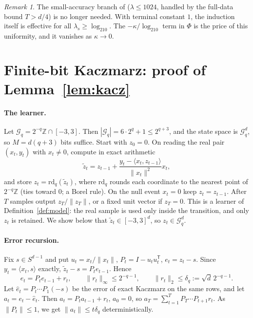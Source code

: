 \documentclass[11pt]{article}
\theoremstyle{definition}
\theoremstyle{remark}
\newtheorem{remark}[theorem]{Remark}
\newcommand{\ip}[2]{\langle #1,#2\rangle}
\newcommand{\norm}[1]{\lVert #1\rVert}
\begin{document}
\begin{remark}
The small-accuracy branch of \cite{OAIsub} (\(\lambda\le1024\), handled by the full-data bound \(T>d/4\)) is no longer needed.
With terminal constant \(1\), the induction itself is effective for all \(\lambda_s\ge\log_210\). The \(-\kappa/\log_210\) term in \(\Phi\)
is the price of this uniformity, and it vanishes as \(\kappa\to0\).
\end{remark}

\section{Finite-bit Kaczmarz: proof of Lemma~\ref{lem:kacz}}\label{sec:kaczmarz}

\paragraph{The learner.} Let \(\mathcal G_q=2^{-q}\mathbb Z\cap[-3,3]\). Then
\(|\mathcal G_q|=6\cdot2^q+1\le2^{q+3}\), and the state space is \(\mathcal G_q^d\), so \(M=d(q+3)\) bits suffice.
Start with \(z_0=0\). On reading the real pair \((x_t,y_t)\) with \(x_t\ne0\), compute in exact arithmetic
\[
 \tilde z_t=z_{t-1}+\frac{y_t-\ip{x_t}{z_{t-1}}}{\norm{x_t}^2}x_t ,
\]
and store \(z_t=\mathrm{rd}_q(\tilde z_t)\), where \(\mathrm{rd}_q\) rounds each coordinate to the nearest point of \(2^{-q}\mathbb Z\)
(ties toward \(0\); a Borel rule). On the null event \(x_t=0\) keep \(z_t=z_{t-1}\). After \(T\) samples output
\(z_T/\norm{z_T}\), or a fixed unit vector if \(z_T=0\). This is a learner of Definition~\ref{def:model}: the real sample is
used only inside the transition, and only \(z_t\) is retained. We show below that \(\tilde z_t\in[-3,3]^d\), so \(z_t\in\mathcal G_q^d\).

\paragraph{Error recursion.} Fix \(s\in S^{d-1}\) and put \(u_t=x_t/\norm{x_t}\), \(P_t=I-u_tu_t^{\mathsf T}\),
\(e_t=z_t-s\). Since \(y_t=\ip{x_t}s\) exactly, \(\tilde z_t-s=P_te_{t-1}\). Hence
\[
 e_t=P_te_{t-1}+r_t,\qquad \norm{r_t}_\infty\le2^{-q-1},\qquad \norm{r_t}_2\le\delta_q:=\sqrt d\,2^{-q-1}.
\]
Let \(\hat e_t=P_t\cdots P_1(-s)\) be the error of exact Kaczmarz on the same rows, and let \(a_t=e_t-\hat e_t\). Then
\(a_t=P_ta_{t-1}+r_t\), \(a_0=0\), so
\(a_T=\sum_{t=1}^TP_T\cdots P_{t+1}r_t\). As \(\norm{P_t}\le1\), we get \(\norm{a_t}\le t\delta_q\) deterministically.
\end{document}
